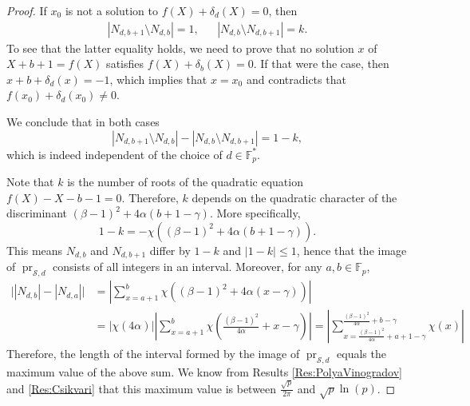 \documentclass[10pt,a4paper]{amsart}
\newcommand{\FF}{\mathbb F}
\newcommand{\ms}{\mathcal S}
\DeclareMathOperator{\pr}{pr}
\begin{document}
\begin{proof}
 If $x_0$ is not a solution to $f(X) + \delta_d(X) = 0$, then
 \begin{align*}
  |N_{d,b+1} \setminus N_{d,b}| = 1, &&
  |N_{d,b} \setminus N_{d,b+1}| = k.
 \end{align*}
 To see that the latter equality holds, we need to prove that no solution $x$ of $X+b+1 = f(X)$ satisfies $f(X) + \delta_b(X) = 0$.
 If that were the case, then $x + b + \delta_d(x) = -1$, which implies that $x = x_0$ and contradicts that $f(x_0) + \delta_d(x_0) \neq 0$.

 We conclude that in both cases
 \[
  |N_{d,b+1} \setminus N_{d,b}| - |N_{d,b} \setminus N_{d,b+1}| = 1-k,
 \]
 which is indeed independent of the choice of $d \in \FF_p^*$.

 Note that $k$ is the number of roots of the quadratic equation $f(X) - X - b - 1 = 0$.
 Therefore, $k$ depends on the quadratic character of the discriminant $(\beta-1)^2 + 4\alpha(b+1-\gamma)$.
 More specifically,
 \[
  1-k = -\chi( (\beta-1)^2 + 4\alpha(b+1-\gamma) ).
 \]
 This means $N_{d,b}$ and $N_{d,b+1}$ differ by $1-k$ and $|1-k| \leq 1$, hence that the image of $\pr_{\ms,d}$ consists of all integers in an interval.
 Moreover, for any $a,b \in \FF_p$,
 \begin{align*}
  \Big | |N_{d,b}| - |N_{d,a}| \Big |
  &= \left | \sum_{x = a+1}^b \chi( (\beta-1)^2 + 4\alpha(x-\gamma) ) \right| \\
  &= |\chi(4 \alpha)| \left | \sum_{x = a+1}^b \chi \left( \frac{(\beta-1)^2}{4\alpha} + x-\gamma \right) \right|
  = \left | \sum_{x = \frac{(\beta-1)^2}{4\alpha} + a+1-\gamma}^{\frac{(\beta-1)^2}{4\alpha} + b-\gamma} \chi \left( x \right) \right|
 \end{align*}
 Therefore, the length of the interval formed by the image of $\pr_{\ms,d}$ equals the maximum value of the above sum.
 We know from Results \ref{Res:PolyaVinogradov} and \ref{Res:Csikvari} that this maximum value is between $\frac{\sqrt p}{2 \pi}$ and $\sqrt p \ln(p)$.
\end{proof}
\end{document}
